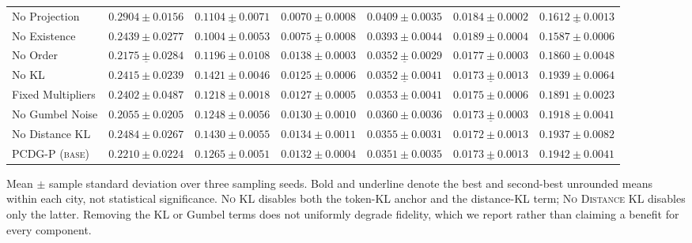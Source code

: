 \begin{table}[t]
\begin{tabular}{lrrrrrr}
\midrule
No Projection & $0.2904\pm 0.0156$ & $\underline{0.1104\pm 0.0071}$ & $\mathbf{0.0070\pm 0.0008}$ & $0.0409\pm 0.0035$ & $0.0184\pm 0.0002$ & $\underline{0.1612\pm 0.0013}$ \\
No Existence & $0.2439\pm 0.0277$ & $\mathbf{0.1004\pm 0.0053}$ & $\underline{0.0075\pm 0.0008}$ & $0.0393\pm 0.0044$ & $0.0189\pm 0.0004$ & $\mathbf{0.1587\pm 0.0006}$ \\
No Order & $\underline{0.2175\pm 0.0284}$ & $0.1196\pm 0.0108$ & $0.0138\pm 0.0003$ & $\underline{0.0352\pm 0.0029}$ & $0.0177\pm 0.0003$ & $0.1860\pm 0.0048$ \\
No KL & $0.2415\pm 0.0239$ & $0.1421\pm 0.0046$ & $0.0125\pm 0.0006$ & $\underline{0.0352\pm 0.0041}$ & $\underline{0.0173\pm 0.0013}$ & $0.1939\pm 0.0064$ \\
Fixed Multipliers & $0.2402\pm 0.0487$ & $0.1218\pm 0.0018$ & $0.0127\pm 0.0005$ & $0.0353\pm 0.0041$ & $0.0175\pm 0.0006$ & $0.1891\pm 0.0023$ \\
No Gumbel Noise & $\mathbf{0.2055\pm 0.0205}$ & $0.1248\pm 0.0056$ & $0.0130\pm 0.0010$ & $0.0360\pm 0.0036$ & $\underline{0.0173\pm 0.0003}$ & $0.1918\pm 0.0041$ \\
No Distance KL & $0.2484\pm 0.0267$ & $0.1430\pm 0.0055$ & $0.0134\pm 0.0011$ & $0.0355\pm 0.0031$ & $\mathbf{0.0172\pm 0.0013}$ & $0.1937\pm 0.0082$ \\
\textsc{PCDG-P (base)} & $0.2210\pm 0.0224$ & $0.1265\pm 0.0051$ & $0.0132\pm 0.0004$ & $\mathbf{0.0351\pm 0.0035}$ & $\underline{0.0173\pm 0.0013}$ & $0.1942\pm 0.0041$ \\
\bottomrule
\end{tabular}
\par\smallskip
\begin{minipage}{\textwidth}\footnotesize
Mean $\pm$ sample standard deviation over three sampling seeds. Bold and underline denote the best and
second-best unrounded means within each city, not statistical significance. \textsc{No KL} disables both the token-KL anchor and
the distance-KL term; \textsc{No Distance KL} disables only the latter. Removing the KL or Gumbel
terms does not uniformly degrade fidelity, which we report rather than claiming a benefit for every
component.
\end{minipage}
\end{table}

